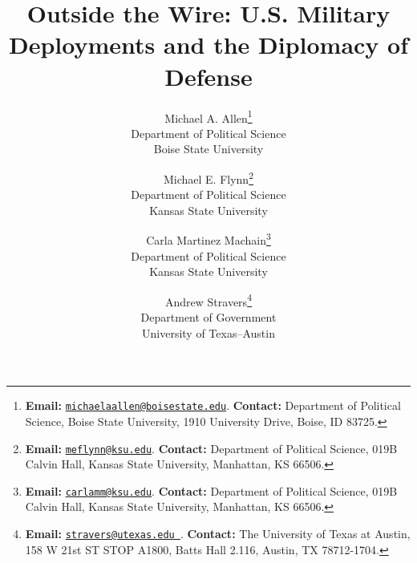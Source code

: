 \documentclass[12pt]{book}
\begin{document}
\begin{titlepage}
	\title{Outside the Wire: U.S. Military Deployments and the Diplomacy of Defense \label{cha:min}}
	\author{Michael A. Allen\thanks{\textbf{Email:} \href{mailto:michaelaallen@boisestate.edu}{\tt michaelaallen@boisestate.edu}. \textbf{Contact:} Department of Political Science, Boise State University, 1910 University Drive, Boise, ID 83725.}\\
		Department of Political Science\\
		Boise State University \\
		\and Michael E. Flynn\thanks{\textbf{Email:} \href{mailto:meflynn@ksu.edu}{\tt meflynn@ksu.edu}. \textbf{Contact:} Department of Political Science, 019B Calvin Hall, Kansas State University, Manhattan, KS 66506.} \\
		Department of Political Science \\
		Kansas State University \\
		\and
		Carla Martinez Machain\thanks{\textbf{Email:} \href{mailto:carlamm@ksu.edu}{\tt carlamm@ksu.edu}. \textbf{Contact:} Department of Political Science, 019B Calvin Hall, Kansas State University, Manhattan, KS 66506.}\\
		Department of Political Science\\
		Kansas State University \\
		\and
		Andrew Stravers\thanks{\textbf{Email:} \href{mailto:stravers@utexas.edu }{\tt stravers@utexas.edu }. \textbf{Contact:} The University of Texas at Austin, 158 W 21st ST STOP A1800, Batts Hall 2.116, Austin, TX 78712-1704.}\\
		Department of Government\\
		University of Texas--Austin
	}
	
	\maketitle

	\thispagestyle{empty}
\end{titlepage}



\frontmatter

\pagestyle{empty}


%





\tableofcontents



\listoftables
{}
\end{document}
